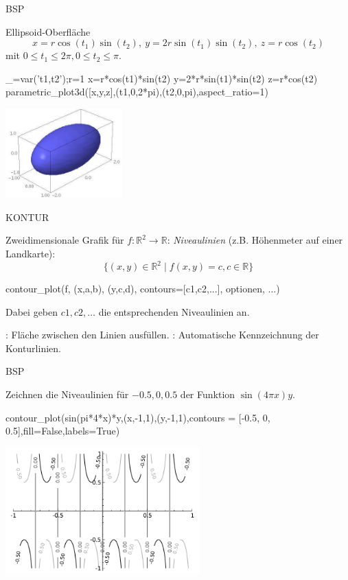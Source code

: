 \documentclass[fontsize=12pt,paper=a4,twoside,bibtotoc,idxtotoc,
liststotoc,pagesize,BCOR1.2cm,DIV15,chapterprefix,pagesize=pdftex]{scrbook}
\theoremstyle{plain}
\theoremstyle{definition}
\theoremstyle{remark}
\begin{document}
BSP

Ellipsoid-Oberfläche
\[ 
x=r \cos(t_1) \sin(t_2), \ y=2r \sin (t_1) \sin (t_2),\ z =r \cos(t_2) 
\]
 mit $0 \leq t_1 \leq 2 \pi, 0 \leq t_2 \leq \pi.$ 
\begin{sagein}
_=var('t1,t2');r=1
x=r*cos(t1)*sin(t2)
y=2*r*sin(t1)*sin(t2)
z=r*cos(t2)
parametric_plot3d([x,y,z],(t1,0,2*pi),(t2,0,pi),aspect_ratio=1)
\end{sagein}
\begin{center}
\includegraphics[width=4.5cm]{surface.jpg} 
\end{center}

KONTUR

Zweidimensionale Grafik für $f:\mathbb{R}^2 \rightarrow \mathbb{R}$:
\emph{Niveaulinien} (z.B. Höhenmeter auf einer
Landkarte):
\[ 
\{(x,y) \in \mathbb{R}^2 \;|\; f(x,y)=c, c \in \mathbb{R}\}
\]

\begin{sagein}
contour_plot(f, (x,a,b), (y,c,d), contours=[c1,c2,...], optionen, ...)
\end{sagein}
Dabei geben $c1,c2,\ldots$ die entsprechenden Niveaulinien an.

  : Fläche zwischen den Linien ausfüllen.
  : Automatische Kennzeichnung der Konturlinien.


BSP

Zeichnen die Niveaulinien für $-0.5, 0, 0.5$ der Funktion $\sin(4\pi x)y$. 
\begin{sagein}
contour_plot(sin(pi*4*x)*y,(x,-1,1),(y,-1,1),contours = [-0.5, 0, 0.5],fill=False,labels=True)
\end{sagein}
\begin{center}
\includegraphics[width=7.5cm]{contour.pdf} 
\end{center}
\end{document}
